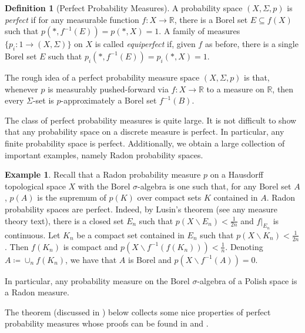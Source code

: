 \documentclass[11pt]{amsart}
\newcommand{\RR}{\mathbb{R}}
\newcommand{\from}{\colon}
\newcommand{\sm}{\smallsetminus}
\theoremstyle{remark}
\theoremstyle{definition}
\newtheorem{ex}[thm]{Example}
\newtheorem{defn}[thm]{Definition}
\begin{document}
\begin{defn}[Perfect Probability Measures]
	A probability space $(X,\Sigma,p)$ is \emph{perfect} if for any measurable function $f \from X \to \RR$, there is a Borel set $E \subseteq f(X)$ such that $p(\ast,f^{-1}(E))=p(\ast,X)=1$. A family of measures $\{p_i \from 1 \to (X,\Sigma)\}$ on $X$ is called \emph{equiperfect} if, given $f$ as before, there is a single Borel set $E$ such that $p_i(\ast,f^{-1}(E))=p_i(\ast,X)=1$. 
\end{defn}

The rough idea of a perfect probability measure space $(X,\Sigma,p)$ is that, whenever $p$ is measurably pushed-forward via $f \from X \to \RR$ to a measure on $\RR$, then every $\Sigma$-set is $p$-approximately a Borel set $f^{-1}(B)$. 

The class of perfect probability measures is quite large.  It is not difficult to show that any probability space on a discrete measure is perfect.  In particular, any finite probability space is perfect.  Additionally, we obtain a large collection of important examples, namely Radon probability spaces.

\begin{ex}
	Recall that a Radon probability measure $p$ on a Hausdorff topological space $X$ with the Borel $\sigma$-algebra is one such that, for any Borel set $A$, $p(A)$ is the supremum of $p(K)$ over compact sets $K$ contained in $A$. Radon probability spaces are perfect.  Indeed, by Lusin's theorem (see any measure theory text), there is a closed set $E_n$ such that $p(X \sm E_n) < \frac{1}{2n}$ and $f|_{E_n}$ is continuous. Let $K_n$ be a compact set contained in $E_n$ such that $p(X \sm K_n) < \frac{1}{2n}$. Then $f(K_n)$ is compact and $p(X \sm f^{-1}(f(K_n))) < \frac{1}{n}$. Denoting $A \coloneqq \cup_n f(K_n)$, we have that $A$ is Borel and $p(X \sm f^{-1}(A))=0$.	
\end{ex}

In particular, any probability measure on the Borel $\sigma$-algebra of a Polish space is a Radon measure.  

The theorem (discussed in \cite[Thm. 2.2]{CulbSturtz_CategoricalBayesProb}) below collects some nice properties of perfect probability measures whose proofs can be found in \cite{Faden_ExistRegCondProbs} and \cite{Rodine_PerfectProbRegCondProb}.
\end{document}
